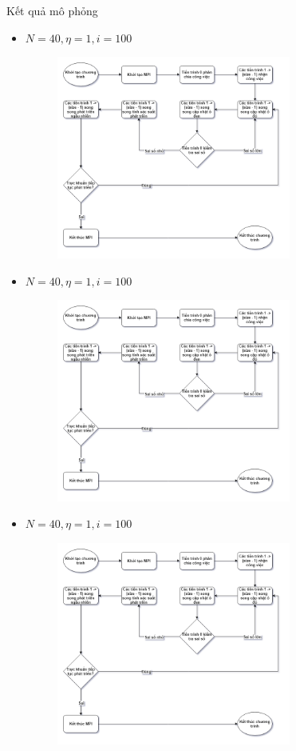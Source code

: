 \begin{frame}[allowframebreaks]{Kết quả mô phỏng}
\begin{itemize}
	\item $N = 40, \eta = 1, i = 100$
    \begin{figure}[H]
        \centering
        \includegraphics[width=77mm]{img/algo-flowchart.png}
    \end{figure}
\end{itemize}
\break
\begin{itemize}
    \item $N = 40, \eta = 1, i = 100$
    \begin{figure}[H]
        \centering
        \includegraphics[width=77mm]{img/algo-flowchart.png}
    \end{figure}
\end{itemize}
\break
\begin{itemize}
    \item $N = 40, \eta = 1, i = 100$
    \begin{figure}[H]
        \centering
        \includegraphics[width=77mm]{img/algo-flowchart.png}

\end{figure}
\end{itemize}
\end{frame}
